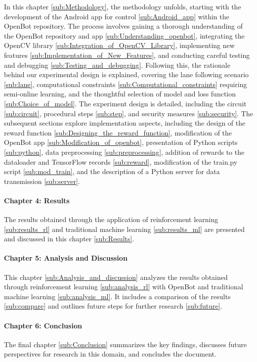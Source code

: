 \documentclass[12pt]{report}
\begin{document}
In this chapter \ref{sub:Methodology}, the methodology unfolds, starting with the development of the Android app for control \ref{sub:Android_app} within the OpenBot repository. The process involves gaining a thorough understanding of the OpenBot repository and app \ref{sub:Understanding_openbot}, integrating the OpenCV library \ref{sub:Integration_of_OpenCV_Library}, implementing new features \ref{sub:Implementation_of_New_Features}, and conducting careful testing and debugging \ref{sub:Testing_and_debugging}. Following this, the rationale behind our experimental design is explained, covering the lane following scenario \ref{sub:lane}, computational constraints \ref{sub:Computational_constraints} requiring semi-online learning, and the thoughtful selection of model and loss function \ref{sub:Choice_of_model}. The experiment design is detailed, including the circuit \ref{sub:circuit}, procedural steps \ref{sub:step}, and security measures \ref{sub:security}. The subsequent sections explore implementation aspects, including the design of the reward function \ref{sub:Designing_the_reward_function}, modification of the OpenBot app \ref{sub:Modification_of_openbot}, presentation of Python scripts \ref{sub:python}, data preprocessing \ref{sub:preprocessing}, addition of rewards to the dataloader and TensorFlow records \ref{sub:reward}, modification of the train.py script \ref{sub:mod_train}, and the description of a Python server for data transmission \ref{sub:server}.

\paragraph{Chapter 4: Results}
The results obtained through the application of reinforcement learning \ref{sub:results_rl} and traditional machine learning \ref{sub:results_ml} are presented and discussed in this chapter \ref{sub:Results}.

\paragraph{Chapter 5: Analysis and Discussion}
This chapter \ref{sub:Analysis_and_discussion} analyzes the results obtained through reinforcement learning \ref{sub:analysis_rl} with OpenBot and traditional machine learning \ref{sub:analysis_ml}. It includes a comparison of the results \ref{sub:compare} and outlines future steps for further research \ref{sub:future}.

\paragraph{Chapter 6: Conclusion}
The final chapter \ref{sub:Conclusion} summarizes the key findings, discusses future perspectives for research in this domain, and concludes the document.
\end{document}
